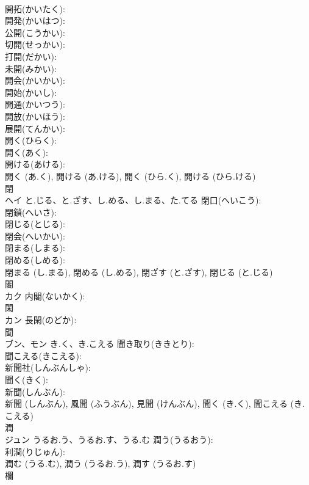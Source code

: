 \documentclass[8pt]{extreport}
\begin{document}
\begin{CJK}{UTF8}{min}
\\	開拓(かいたく): 
\\	開発(かいはつ): 
\\	公開(こうかい): 
\\	切開(せっかい): 
\\	打開(だかい): 
\\	未開(みかい): 
\\	開会(かいかい): 
\\	開始(かいし): 
\\	開通(かいつう): 
\\	開放(かいほう): 
\\	展開(てんかい): 
\\	開く(ひらく): 
\\	開く(あく): 
\\	開ける(あける): 
\\	開く (あ.く), 開ける (あ.ける), 開く (ひら.く), 開ける (ひら.ける)
\\	閉			
\\	ヘイ	と.じる、と.ざす、し.める、し.まる、た.てる	閉口(へいこう): 
\\	閉鎖(へいさ): 
\\	閉じる(とじる): 
\\	閉会(へいかい): 
\\	閉まる(しまる): 
\\	閉める(しめる): 
\\	閉まる (し.まる), 閉める (し.める), 閉ざす (と.ざす), 閉じる (と.じる)
\\	閣			
\\	カク		内閣(ないかく): 
\\	閑			
\\	カン		長閑(のどか): 
\\	聞			
\\	ブン、モン	き.く、き.こえる	聞き取り(ききとり): 
\\	聞こえる(きこえる): 
\\	新聞社(しんぶんしゃ): 
\\	聞く(きく): 
\\	新聞(しんぶん): 
\\	新聞 (しんぶん), 風聞 (ふうぶん), 見聞 (けんぶん), 聞く (き.く), 聞こえる (き.こえる)
\\	潤			
\\	ジュン	うるお.う、うるお.す、うる.む	潤う(うるおう): 
\\	利潤(りじゅん): 
\\	潤む (うる.む), 潤う (うるお.う), 潤す (うるお.す)
\\	欄			

\end{CJK}
\end{document}
